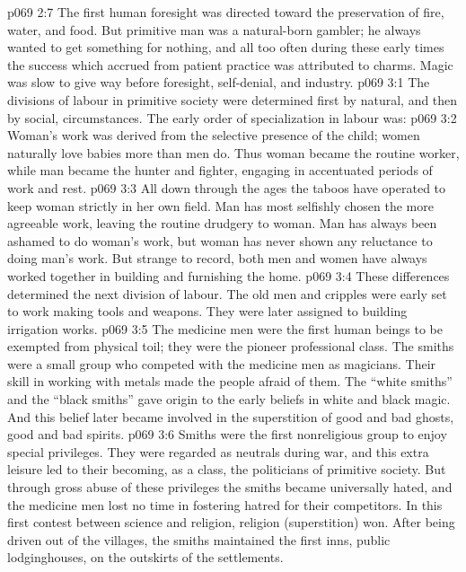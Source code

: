 \vs p069 2:7 The first human foresight was directed toward the preservation of fire, water, and food. But primitive man was a natural\hyp{}born gambler; he always wanted to get something for nothing, and all too often during these early times the success which accrued from patient practice was attributed to charms. Magic was slow to give way before foresight, self\hyp{}denial, and industry.
\vs p069 3:1 The divisions of labour in primitive society were determined first by natural, and then by social, circumstances. The early order of specialization in labour was:
\vs p069 3:2 \bibnobreakspace {} Woman’s work was derived from the selective presence of the child; women naturally love babies more than men do. Thus woman became the routine worker, while man became the hunter and fighter, engaging in accentuated periods of work and rest.
\vs p069 3:3 \pc All down through the ages the taboos have operated to keep woman strictly in her own field. Man has most selfishly chosen the more agreeable work, leaving the routine drudgery to woman. Man has always been ashamed to do woman’s work, but woman has never shown any reluctance to doing man’s work. But strange to record, both men and women have always worked together in building and furnishing the home.
\vs p069 3:4 \bibnobreakspace {} These differences determined the next division of labour. The old men and cripples were early set to work making tools and weapons. They were later assigned to building irrigation works.
\vs p069 3:5 \bibnobreakspace {} The medicine men were the first human beings to be exempted from physical toil; they were the pioneer professional class. The smiths were a small group who competed with the medicine men as magicians. Their skill in working with metals made the people afraid of them. The “white smiths” and the “black smiths” gave origin to the early beliefs in white and black magic. And this belief later became involved in the superstition of good and bad ghosts, good and bad spirits.
\vs p069 3:6 Smiths were the first nonreligious group to enjoy special privileges. They were regarded as neutrals during war, and this extra leisure led to their becoming, as a class, the politicians of primitive society. But through gross abuse of these privileges the smiths became universally hated, and the medicine men lost no time in fostering hatred for their competitors. In this first contest between science and religion, religion (superstition) won. After being driven out of the villages, the smiths maintained the first inns, public lodginghouses, on the outskirts of the settlements.
